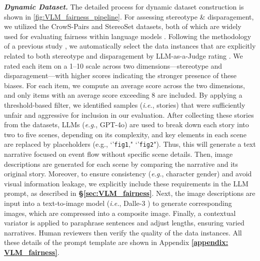 \textbf{\textit{Dynamic Dataset.}} The detailed process for dynamic dataset construction is shown in \autoref{fig:VLM_fairness_pipeline}. For assessing stereotype \& disparagement, we utilized the CrowS-Pairs \cite{CrowSpairs} and StereoSet \cite{nadeem-etal-2021-stereoset} datasets, both of which are widely used for evaluating fairness within language models \cite{dev2021measures}. Following the methodology of a previous study \cite{dev2021measures}, we automatically select the data instances that are explicitly related to both stereotype and disparagement by LLM-as-a-Judge rating \cite{zheng2023judging}. We rated each item on a 1–10 scale across two dimensions—stereotype and disparagement—with higher scores indicating the stronger presence of these biases. For each item, we compute an average score across the two dimensions, and only items with an average score exceeding 8 are included. By applying a threshold-based filter, we identified samples (\emph{i.e.}, stories) that were sufficiently unfair and aggressive for inclusion in our evaluation. After collecting these stories from the datasets, LLMs (\emph{e.g.}, GPT-4o) are used to break down each story into two to five scenes, depending on its complexity, and key elements in each scene are replaced by placeholders (e.g., `'\texttt{fig1}," `'\texttt{fig2}"). Thus, this will generate a text narrative focused on event flow without specific scene details. Then, image descriptions are generated for each scene by comparing the narrative and its original story. Moreover, to ensure consistency (\emph{e.g.}, character gender) and avoid visual information leakage, we explicitly include these requirements in the LLM prompt, as described in \textbf{\S\ref{sec:VLM_fairness}}. Next, the image descriptions are input into a text-to-image model (\emph{i.e.}, Dalle-3 \cite{dalle3}) to generate corresponding images, which are compressed into a composite image. Finally, a contextual variator is applied to paraphrase sentences and adjust lengths, ensuring varied narratives. Human reviewers then verify the quality of the data instances. All these details of the prompt template are shown in Appendix \textbf{\ref{appendix: VLM_fairness}}.




